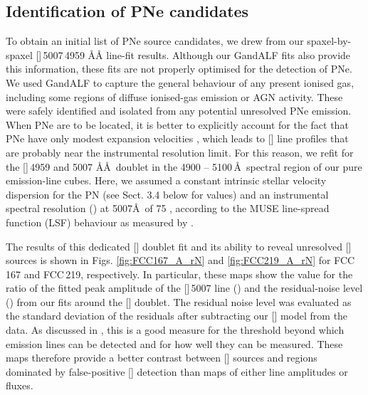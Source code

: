 \documentclass{aa}
\begin{document}
\subsection{Identification of PNe candidates}
To obtain an initial list of PNe source candidates, we drew from our spaxel-by-spaxel []\,5007\,4959 \AA\AA{} line-fit results. Although our GandALF fits also provide this information, these fits are not properly optimised for the detection of PNe. We used GandALF to capture the general behaviour of any present ionised gas, including some regions of diffuse ionised-gas emission or AGN activity. These were safely identified and isolated from any potential unresolved PNe emission. When PNe are to be located, it is better to explicitly account for the fact that PNe have only modest expansion velocities \citep[between 10 and 40 ;][]{weinberger_newly_1983, hajian_atlas_2007, schonberner_hydrodynamical_2014}, which leads to [] line profiles that are probably near the instrumental resolution limit. For this reason, we refit for the []\,4959 and 5007 \AA\AA\  doublet in the 4900 -- 5100\,\AA\ spectral region of our pure emission-line cubes. Here, we assumed a constant intrinsic stellar velocity dispersion for the PN (see Sect. 3.4 below for values) and an instrumental spectral resolution () at 5007\AA\ of 75  , according to the MUSE line-spread function (LSF) behaviour as measured by \citet{guerou_muse_2017}.

The results of this dedicated [] doublet fit and its ability to reveal unresolved [] sources is shown in Figs. \ref{fig:FCC167_A_rN} and \ref{fig:FCC219_A_rN} for FCC\,167 and FCC\,219, respectively. In particular, these maps show the value for the ratio of the fitted peak amplitude of the []\,5007 line () and the residual-noise level () from our fits around the [] doublet. The residual noise level was evaluated as the standard deviation of the residuals after subtracting our [] model from the data. As discussed in \citet{sarzi_sauron_2006}, this   is a good measure for the threshold beyond which emission lines can be detected and for how well they can be measured. These  maps therefore provide a better contrast between [] sources and regions dominated by false-positive [] detection than maps of either line amplitudes or fluxes.
\end{document}
